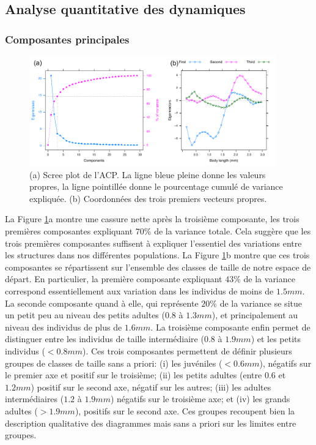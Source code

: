 {\begin{longtable}
\end{longtable}
}

\subsection{Analyse quantitative des dynamiques}

\subsubsection{Composantes principales}

\begin{figure}[!ht]
\begin{center}
\includegraphics[width=0.95\textwidth]{1_CorpsDeThese/Resumes/Fig/SP02}
\caption[Composantes
principales]{(a) Scree plot de l'ACP. La ligne bleue pleine donne les valeurs
propres, la ligne pointillée donne le pourcentage cumulé de variance expliquée.
(b) Coordonnées des trois premiers vecteurs propres.}
\label{fig:SP2}
\end{center}
\end{figure}

La Figure \ref{fig:SP2}a montre une cassure nette après la troisième composante,
les trois premières composantes expliquant $70\%$ de la variance totale. Cela
suggère que les trois premières composantes suffisent à expliquer l'essentiel
des variations entre les structures dans nos différentes populations. La Figure
\ref{fig:SP2}b montre que ces trois composantes se répartissent sur l'ensemble
des classes de taille de notre espace de départ. En particulier, la première
composante expliquant $43\%$ de la variance correspond essentiellement aux
variation dans les individus de moins de $1.5mm$. La seconde composante quand à
elle, qui représente $20\%$ de la variance se situe un petit peu au niveau des
petits adultes ($0.8$ à $1.3mm$), et principalement au niveau des individus de
plus de $1.6mm$. La troisième composante enfin permet de distinguer entre les
individus de taille intermédiaire ($0.8$ à $1.9mm$) et les petits individus
($<0.8mm$). Ces trois composantes permettent de définir plusieurs groupes de
classes de taille sans a priori: (i) les juvéniles ($<0.6mm$), négatifs sur le
premier axe et positif sur le troisième; (ii) les petits adultes (entre $0.6$
et $1.2mm$) positif sur le second axe, négatif sur les autres; (iii) les adultes
intermédiaires ($1.2$ à $1.9mm$) négatifs sur le troisième axe; et (iv) les
grands adultes ($>1.9mm$), positifs sur le second axe. Ces groupes recoupent
bien la description qualitative des diagrammes mais sans a priori sur les
limites entre groupes. 


